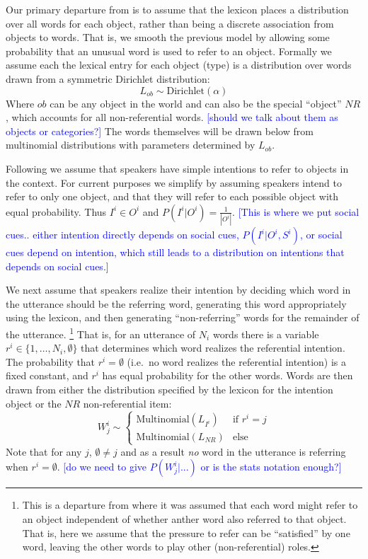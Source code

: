 \documentclass[man,noapacite,12pt]{apa2}
\newcommand{\nnote}[1]{\textcolor{blue}{[#1]}}
\begin{document}
Our primary departure from \cite{frank2009} is to assume that the lexicon places a distribution over all words for each object, rather than being a discrete association from objects to words. That is, we smooth the previous model by allowing some probability that an unusual word is used to refer to an object. Formally we assume each the lexical entry for each object (type) is a distribution over words drawn from a symmetric Dirichlet distribution:
\begin{equation}
L_{ob} \sim \text{Dirichlet}(\alpha)
\end{equation}
Where $ob$ can be any object in the world and can also be the special ``object'' $NR$, which accounts for all non-referential words. \nnote{should we talk about them as objects or categories?}
The words themselves will be drawn below from multinomial distributions with parameters determined by $L_{ob}$.

Following \cite{frank2009} we assume that speakers have simple intentions to refer to objects in the context. For current purposes we simplify by assuming speakers intend to refer to only one object, and that they will refer to each possible object with equal probability. Thus $I^{i} \in O^{i}$ and
$P(I^{i}| O^{i}) = \frac{1}{|O^{i}|}$.
\nnote{This is where we put social cues.. either intention directly depends on social cues, $P(I^{i}| O^{i},S^{i})$, or social cues depend on intention, which still leads to a distribution on intentions that depends on social cues.}

We next assume that speakers realize their intention by deciding which word in the utterance should be the referring word, generating this word appropriately using the lexicon, and then generating ``non-referring'' words for the remainder of the utterance. \footnote{This is a departure from \cite{frank2009} where it was assumed that each word might refer to an object independent of whether anther word also referred to that object. That is, here we assume that the pressure to refer can be ``satisfied'' by one word, leaving the other words to play other (non-referential) roles.}
That is, for an utterance of $N_{i}$ words there is a variable $r^{i} \in \{1,\dots,N_{i}, \emptyset \}$ that determines which word realizes the referential intention. The probability that $r^{i}=\emptyset$ (i.e.~no word realizes the referential intention) is a fixed constant, and $r^{i}$ has equal probability for the other words.
Words are then drawn from either the distribution specified by the lexicon for the intention object or the $NR$ non-referential item:
\begin{equation}
W^{i}_{j} \sim 
\begin{cases}
\text{Multinomial}(L_{I^{i}}) & \text{if } r^{i}=j \\
\text{Multinomial}(L_{NR}) & \text{else}
\end{cases}
\end{equation}
Note that for any $j$, $\emptyset \neq j$ and as a result \emph{no} word in the utterance is referring when $r^{i}=\emptyset$.
\nnote{do we need to give $P(W^{i}_{j}|...)$ or is the stats notation enough?}
\end{document}
